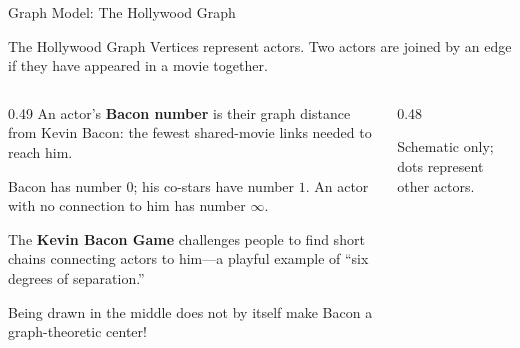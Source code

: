 \documentclass[aspectratio=169,11pt]{beamer}
\begin{document}
\begin{frame}[t]{Graph Model: The Hollywood Graph}
\begin{block}{The Hollywood Graph}
Vertices represent actors. Two actors are joined by an edge if they have appeared in a movie together.
\end{block}

\vspace{0.18cm}
\begin{columns}[c,onlytextwidth]
\begin{column}{0.49\textwidth}
\small
An actor's \textbf{Bacon number} is their graph distance from Kevin Bacon: the fewest shared-movie links needed to reach him.

\medskip
Bacon has number $0$; his co-stars have number $1$. An actor with no connection to him has number $\infty$.

\medskip
The \textbf{Kevin Bacon Game} challenges people to find short chains connecting actors to him---a playful example of ``six degrees of separation.''

\medskip
Being drawn in the middle does not by itself make Bacon a graph-theoretic center!
\end{column}
\begin{column}{0.48\textwidth}
\centering
{}
\par\smallskip
{\scriptsize Schematic only; dots represent other actors.}
\end{column}
\end{columns}
\end{frame}
\end{document}
